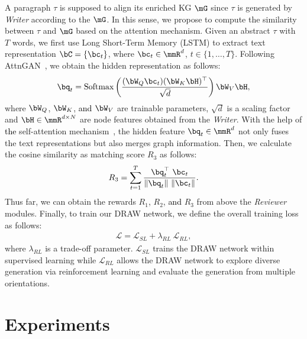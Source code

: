 \documentclass[letterpaper]{article}
\def\hmg{\textcolor{black}}
\begin{document}
A paragraph $\tau$ is supposed to align its enriched KG $\mG$ since $\tau$ is generated by \textit{Writer} according to the $\mG$. In this sense, we propose to compute the similarity between $\tau$ and $\mG$ based on the attention mechanism. Given an abstract $\tau$ with $T$ words, we first use Long Short-Term Memory (LSTM) to extract text representation $\bC=\{\bc_t\}$, where $ \bc_t\in \mmR^d$,  $t \in \{1,\dots,T\}$. Following AttnGAN~\cite{AttnGANFT}, we obtain the hidden representation as follows:
\begin{equation}
    \begin{aligned}
    \bq_t= \mathrm{Softmax} \left(\frac{(\bW_{Q} \bc_t) (\bW_{K} \bH)^\top}{\sqrt{d}}\right) \bW_{V} \bH,
    \end{aligned}
\end{equation}
where $\bW_{Q}$, $\bW_{K}$, \hmg{and} $\bW_{V}$ are trainable parameters, $\sqrt{d}$ is a scaling factor and $\bH \in \mmR^{d \times N}$ are node features obtained from the \textit{Writer}. With the help of \hmg{the} self-attention mechanism~\cite{Vaswani2017AttentionIA}, the hidden feature $\bq_t \in \mmR^{d}$ not only fuses the text representations but also merges graph information.
Then, we calculate the cosine similarity as matching score $R_3$ as follows:
\begin{equation}
    \begin{aligned}
    R_3 = \sum_{t=1}^{T} \frac{\bq_t^\top \ \bc_t}{\|  \bq_t\| \ \|  \bc_t\|}.
    \end{aligned}
\end{equation}
Thus far, we can obtain the rewards $R_{1}$,  $R_{2}$, \hmg{and}
$R_{3}$ from above the \textit{Reviewer} modules.
Finally, to train our DRAW network, we define the overall training loss as follows:
\begin{equation}
    \begin{aligned}
    \label{eq:overall_loss}
    \mathcal{L} = \mathcal{L}_{SL} + \lambda_{RL} \ \mathcal{L}_{RL},
    \end{aligned}
\end{equation}
where $\lambda_{RL}$ is a trade-off parameter. $\mathcal{L}_{SL}$  trains the DRAW network within supervised learning while $\mathcal{L}_{RL}$ allows the DRAW network to explore diverse generation via reinforcement learning and evaluate the generation from multiple orientations.


\section{Experiments}
\end{document}
